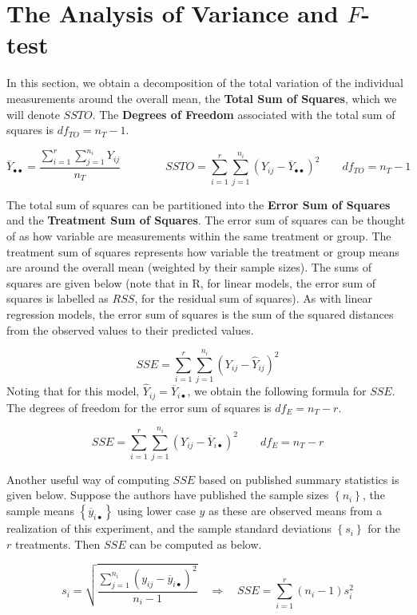 \documentclass[
]{book}
\begin{document}
\section{\texorpdfstring{The Analysis of Variance and
\(F\)-test}{The Analysis of Variance and F-test}}\label{the-analysis-of-variance-and-f-test}

In this section, we obtain a decomposition of the total variation of the
individual measurements around the overall mean, the \textbf{Total Sum
of Squares}, which we will denote \(SSTO\). The \textbf{Degrees of
Freedom} associated with the total sum of squares is \(df_{TO}=n_T-1\).

\[
\overline{Y}_{\bullet\bullet}=
\frac{\sum_{i=1}^r\sum_{j=1}^{n_i}Y_{ij}}{n_T}
\qquad \qquad
SSTO = \sum_{i=1}^r\sum_{j=1}^{n_i}
  \left(Y_{ij}-\overline{Y}_{\bullet\bullet}\right)^2
\qquad  df_{TO}=n_T-1
\]

The total sum of squares can be partitioned into the \textbf{Error Sum
of Squares} and the \textbf{Treatment Sum of Squares}. The error sum of
squares can be thought of as how variable are measurements within the
same treatment or group. The treatment sum of squares represents how
variable the treatment or group means are around the overall mean
(weighted by their sample sizes). The sums of squares are given below
(note that in R, for linear models, the error sum of squares is labelled
as \(RSS\), for the residual sum of squares). As with linear regression
models, the error sum of squares is the sum of the squared distances
from the observed values to their predicted values.

\[
SSE = \sum_{i=1}^r\sum_{j=1}^{n_i}  \left(Y_{ij}-\hat{Y}_{ij}\right)^2
\] Noting that for this model, \(\hat{Y}_{ij}=\overline{Y}_{i\bullet}\),
we obtain the following formula for \(SSE\). The degrees of freedom for
the error sum of squares is \(df_E=n_T-r\).

\[
SSE=\sum_{i=1}^r\sum_{j=1}^{n_i} \left(Y_{ij}-\overline{Y}_{i\bullet}\right)^2
\qquad df_E=n_T-r
\]

Another useful way of computing \(SSE\) based on published summary
statistics is given below. Suppose the authors have published the sample
sizes \(\left\{n_i\right\}\), the sample means
\(\left\{\overline{y}_{i\bullet}\right\}\) using lower case \(y\) as
these are observed means from a realization of this experiment, and the
sample standard deviations \(\left\{s_i\right\}\) for the \(r\)
treatments. Then \(SSE\) can be computed as below.

\[ 
s_i = \sqrt{\frac{\sum_{j=1}^{n_i}\left(y_{ij}-\overline{y}_{i\bullet}\right)^2}{n_i-1}}
\quad \Rightarrow \quad
SSE = \sum_{i=1}^r\left(n_i-1\right)s_i^2 
\]
\end{document}
